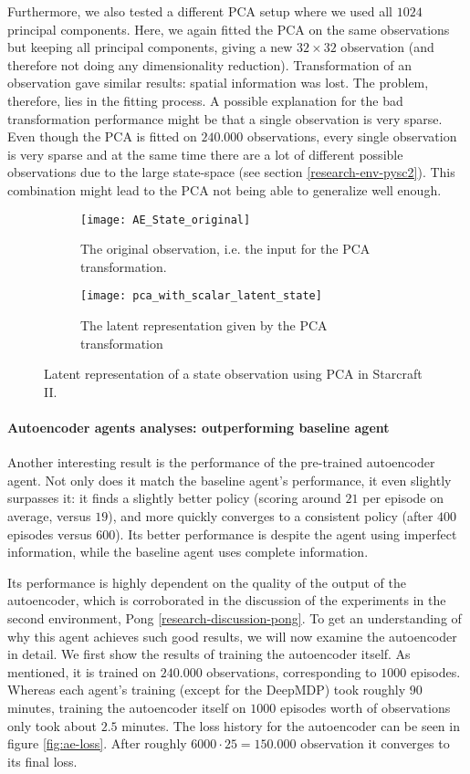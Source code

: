 Furthermore, we also tested a different PCA setup where we used all $1024$ principal components. Here, we again fitted the PCA on the same observations but keeping all principal components, giving a new $32 \times 32$ observation (and therefore not doing any dimensionality reduction). Transformation of an observation gave similar results: spatial information was lost. The problem, therefore, lies in the fitting process. A possible explanation for the bad transformation performance might be that a single observation is very sparse. Even though the PCA is fitted on $240.000$ observations, every single observation is very sparse and at the same time there are a lot of different possible observations due to the large state-space (see section \ref{research-env-pysc2}). This combination might lead to the PCA not being able to generalize well enough.

\begin{figure}[h!]
	\centering
	\begin{subfigure}[b]{0.3\textwidth}
		\texttt{[image: AE\_State\_original]}
		\caption{The original observation, i.e. the input for the PCA transformation.}
		\label{fig:pca-original} 
	\end{subfigure}\hfill
	\begin{subfigure}[b]{0.3\textwidth}
	\texttt{[image: pca\_with\_scalar\_latent\_state]}
		\caption{The latent representation given by the PCA transformation}
		\label{fig:pca-latent}
	\end{subfigure}
	\caption{Latent representation of a state observation using PCA in Starcraft II.}
	\label{fig:pca-state}
\end{figure}

\paragraph{Autoencoder agents analyses: outperforming baseline agent}
Another interesting result is the performance of the pre-trained autoencoder agent. Not only does it match the baseline agent's performance, it even slightly surpasses it: it finds a slightly better policy (scoring around $21$ per episode on average, versus $19$), and more quickly converges to a consistent policy (after $400$ episodes versus $600$). Its better performance is despite the agent using imperfect information, while the baseline agent uses complete information.

Its performance is highly dependent on the quality of the output of the autoencoder, which is corroborated in the discussion of the experiments in the second environment, Pong \ref{research-discussion-pong}. To get an understanding of why this agent achieves such good results, we will now examine the autoencoder in detail. We first show the results of training the autoencoder itself. As mentioned, it is trained on $240.000$ observations, corresponding to $1000$ episodes. Whereas each agent's training (except for the DeepMDP) took roughly $90$ minutes, training the autoencoder itself on $1000$ episodes worth of observations only took about $2.5$ minutes. The loss history for the autoencoder can be seen in figure \ref{fig:ae-loss}. After roughly $6000 \cdot 25 = 150.000$ observation it converges to its final loss.

